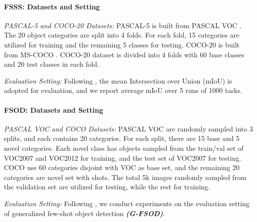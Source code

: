 \documentclass{article}
\begin{document}
\paragraph{FSSS: Datasets and Setting}
\emph{PASCAL-5 and COCO-20 Datasets:}
PASCAL-5 is built from PASCAL VOC \cite{everingham2010pascal}.
The 20 object categories are split into 4 folds. For each fold, 15 categories are utilized for training and the remaining 5 classes for testing.
COCO-20 is built from MS-COCO \cite{ms-COCO}. COCO-20 dataset is divided into 4 folds with 60 base classes and 20 test classes in each fold.

\emph{Evaluation Setting:}
Following \cite{ppnet}, the mean Intersection over Union (mIoU) is adopted for evaluation, and we report average mIoU over 5 runs of 1000 tasks.

\paragraph{FSOD: Datasets and Setting}
\emph{PASCAL VOC and COCO Datasets:}
PASCAL VOC \cite{everingham2010pascal} are randomly sampled into 3 splits, and each contains 20 categories. For each split, there are 15 base and 5 novel categories.
Each novel class has  objects sampled from the train/val set of VOC2007 and VOC2012 for training, and the test set of VOC2007 for testing.
COCO \cite{lin2014microsoft} use 60 categories disjoint with VOC as base set, and the remaining 20 categories are novel set with  shots. The total 5k images randomly sampled from the validation set are utilized for testing, while the rest for training.

\emph{Evaluation Setting:} Following \cite{wang2020frustratingly,qiao2021defrcn}, we conduct experiments on the evaluation setting of generalized few-shot object detection \textit{\textbf{(G-FSOD)}}. 



\end{document}
